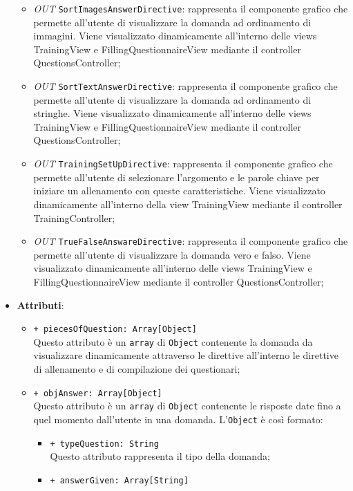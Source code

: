 \begin{itemize}
\begin{itemize}
					\item \textit{OUT} \texttt{SortImagesAnswerDirective}: rappresenta il componente grafico che permette all'utente di visualizzare la domanda ad ordinamento di immagini. Viene visualizzato dinamicamente all'interno delle views TrainingView e FillingQuestionnaireView mediante il controller QuestionsController;
					\item \textit{OUT} \texttt{SortTextAnswerDirective}: rappresenta il componente grafico che permette all'utente di visualizzare la domanda ad ordinamento di stringhe. Viene visualizzato dinamicamente all'interno delle views TrainingView e FillingQuestionnaireView mediante il controller QuestionsController;
					\item \textit{OUT} \texttt{TrainingSetUpDirective}: rappresenta il componente grafico che permette all'utente di selezionare l'argomento e le parole chiave per iniziare un allenamento con queste caratteristiche. Viene visualizzato dinamicamente all'interno della view TrainingView mediante il controller TrainingController;
					\item \textit{OUT} \texttt{TrueFalseAnswareDirective}: rappresenta il componente grafico che permette all'utente di visualizzare la domanda vero e falso. Viene visualizzato dinamicamente all'interno delle views TrainingView e FillingQuestionnaireView mediante il controller QuestionsController;					
				\end{itemize}
				\item \textbf{Attributi}: 
				\begin{itemize}
					\item \texttt{+ piecesOfQuestion: Array[Object]} \\
					Questo attributo è un \texttt{array} di \texttt{Object} contenente la domanda da visualizzare dinamicamente attraverso le direttive all'interno le direttive di allenamento e di compilazione dei questionari;
					\item \texttt{+ objAnswer: Array[Object]} \\
					Questo attributo è un \texttt{array} di \texttt{Object} contenente le risposte date fino a quel momento dall'utente in una domanda. L'\texttt{Object} è così formato: \\
					\begin{itemize}
						\item \texttt{+ typeQuestion: String} \\
						Questo attributo rappresenta il tipo della domanda;
						\item \texttt{+ answerGiven: Array[String]} \\

\end{itemize}
\end{itemize}
\end{itemize}
